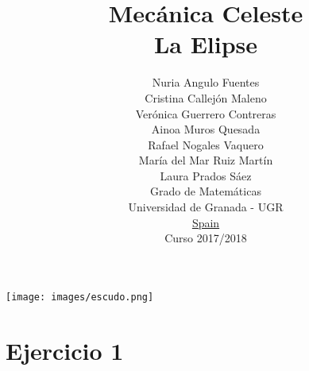 \documentclass[12pt]{article}
\title{
    Mecánica Celeste\\
    \large La Elipse 
}
\author{
		Nuria Angulo Fuentes \\
		Cristina Callejón Maleno \\
		Verónica Guerrero Contreras \\
		Ainoa Muros Quesada \\
		Rafael Nogales Vaquero \\		
		María del Mar Ruiz Martín \\		
		Laura Prados Sáez \\
		
        
        
        Grado de Matemáticas\\
        Universidad de Granada - UGR\\
        \underline{Spain}\\
        Curso 2017/2018
        \date{}
}
\begin{document}
\maketitle
\begin{center}
\texttt{[image: images/escudo.png]}
\end{center}

\pagebreak

\section{Ejercicio 1}
\end{document}

